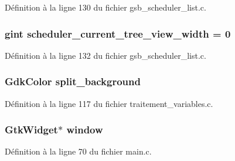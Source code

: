 Définition à la ligne 130 du fichier gsb\_\-scheduler\_\-list.c.

\subsubsection[{scheduler\_\-current\_\-tree\_\-view\_\-width}]{\setlength{\rightskip}{0pt plus 5cm}gint {\bf scheduler\_\-current\_\-tree\_\-view\_\-width} = 0}\label{gsb__scheduler__list_8c_afa241b31ec5f7f4750793852e3f49eeb}


Définition à la ligne 132 du fichier gsb\_\-scheduler\_\-list.c.

\subsubsection[{split\_\-background}]{\setlength{\rightskip}{0pt plus 5cm}GdkColor {\bf split\_\-background}}\label{gsb__scheduler__list_8c_abc4f631d953e2be68189a6fbcf55cd1d}


Définition à la ligne 117 du fichier traitement\_\-variables.c.

\subsubsection[{window}]{\setlength{\rightskip}{0pt plus 5cm}GtkWidget$\ast$ {\bf window}}\label{gsb__scheduler__list_8c_a3d346c08cf2d67c388caabffb412b293}


Définition à la ligne 70 du fichier main.c.

